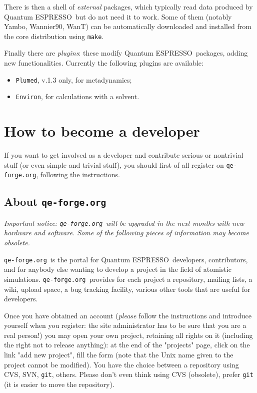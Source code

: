 \documentclass[12pt,a4paper]{article}
\def\qe{{\sc Quantum ESPRESSO}}
\def\qeforge{\texttt{qe-forge.org}}
\begin{document}
There is then a shell of {\em external} packages, which typically
read data produced by \qe\ but do not need it to work. Some of them
(notably Yambo, Wannier90, WanT) can be automatically downloaded and
installed from the core distribution using \texttt{make}.

Finally there are {\em plugins}: these modify \qe\ packages, adding
new functionalities. Currently the following plugins are available:
\begin{itemize}
\item \texttt{Plumed},  v.1.3 only, for metadynamics;
\item \texttt{Environ}, for calculations with a solvent.
\end{itemize}

\section{How to become a developer}
\label{SubSec:BeDev}

If you want to get involved as a developer and contribute serious
or nontrivial stuff (or even simple and trivial stuff), you should
first of all register on \qeforge, following the instructions.

\subsection{About \qeforge}
\label{SubSec:qeforge}

{\em Important notice: \qeforge\ will be upgraded in the next months
with new hardware and software. Some of the following pieces of
information may become obsolete.}

\qeforge\ is the portal for \qe\ developers, contributors,
and for anybody else wanting to develop a project in the
field of atomistic simulations. \qeforge\ provides for
each project a repository, mailing lists, a wiki, upload
space, a bug tracking facility, various other tools that
are useful for developers.

Once you have obtained an account ({\em please} follow the
instructions and introduce yourself when you register: the
site administrator has to be sure that you are a real person!)
you may open your own project, retaining all rights on it
(including the right not to release anything): at the end of
the "projects" page, click on the link "add new project", fill
the form (note that the Unix name given to the project cannot
be modified). You have the choice between a repository using
CVS, SVN, \texttt{git}, others. Please don't even think using CVS
(obsolete), prefer \texttt{git} (it is easier to move the
repository).
\end{document}
